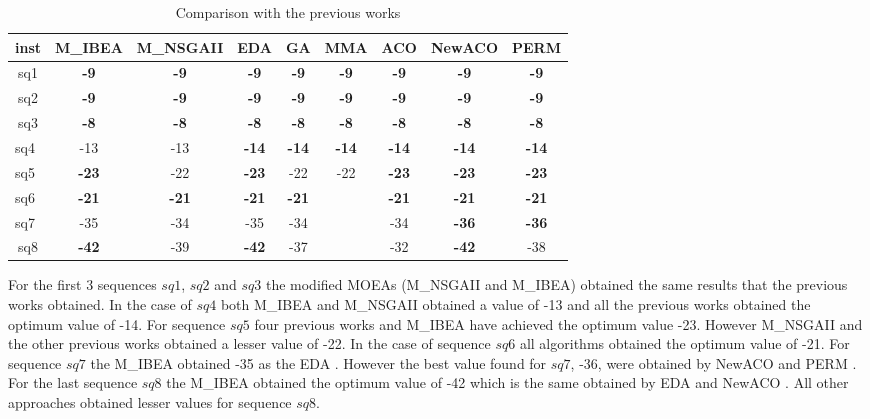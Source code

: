 \begin{table}[]
	\centering
	\caption{Comparison with the previous works}
	\label{tab:comparison}
	\begin{tabular}{ccccccccc}
		\hline
		inst                    & M\_IBEA      & M\_NSGAII    & EDA          & GA           & MMA          & ACO          & NewACO       & PERM         \\ \hline
		sq1                     & \textbf{-9}  & \textbf{-9}  & \textbf{-9}  & \textbf{-9}  & \textbf{-9}  & \textbf{-9}  & \textbf{-9}  & \textbf{-9}  \\ \hline
		sq2                     & \textbf{-9}  & \textbf{-9}  & \textbf{-9}  & \textbf{-9}  & \textbf{-9}  & \textbf{-9}  & \textbf{-9}  & \textbf{-9}  \\ \hline
		sq3                     & \textbf{-8}  & \textbf{-8}  & \textbf{-8}  & \textbf{-8}  & \textbf{-8}  & \textbf{-8}  & \textbf{-8}  & \textbf{-8}  \\ \hline
		\multicolumn{1}{l}{sq4} & -13          & -13          & \textbf{-14} & \textbf{-14} & \textbf{-14} & \textbf{-14} & \textbf{-14} & \textbf{-14} \\ \hline
		\multicolumn{1}{l}{sq5} & \textbf{-23} & -22          & \textbf{-23} & -22          & -22          & \textbf{-23} & \textbf{-23} & \textbf{-23} \\ \hline
		\multicolumn{1}{l}{sq6} & \textbf{-21} & \textbf{-21} & \textbf{-21} & \textbf{-21} &              & \textbf{-21} & \textbf{-21} & \textbf{-21} \\ \hline
		\multicolumn{1}{l}{sq7} & -35          & -34          & -35          & -34          &              & -34          & \textbf{-36} & \textbf{-36} \\ \hline
		sq8                     & \textbf{-42} & -39          & \textbf{-42} & -37          &              & -32          & \textbf{-42} & -38          \\ \hline
	\end{tabular}
\end{table}


 For the first 3 sequences $sq1$, $sq2$ and $sq3$ the modified MOEAs (M\_NSGAII and M\_IBEA) obtained the same results that the previous works obtained. In the case of $sq4$ both M\_IBEA and M\_NSGAII obtained a value of -13 and all the previous works obtained the optimum value of -14. For sequence $sq5$ four previous works and M\_IBEA have achieved the optimum value -23. However M\_NSGAII and the other previous works obtained a lesser value of -22. In the case of sequence $sq6$ all algorithms obtained the optimum value of -21. For sequence $sq7$ the M\_IBEA obtained -35 as the EDA \cite{santana2008protein}. However the best value found  for $sq7$, -36, were obtained by NewACO \cite{shmygelska2003improved} and PERM \cite{hsu2003growth}. For the last sequence $sq8$ the M\_IBEA obtained the optimum value of -42 which is the same obtained by EDA \cite{santana2008protein} and NewACO \cite{shmygelska2003improved}. All other approaches obtained lesser values for sequence $sq8$.


